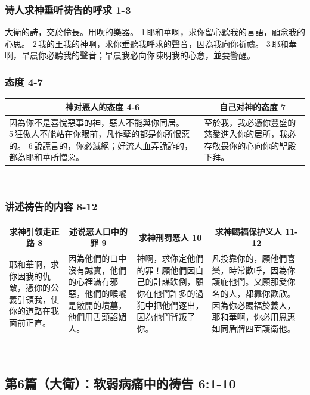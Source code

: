\subsubsection{诗人求神垂听祷告的呼求  1-3}
大衛的詩，交於伶長。用吹的樂器。
1 耶和華啊，求你留心聽我的言語，顧念我的心思。
2 我的王我的神啊，求你垂聽我呼求的聲音，因為我向你祈禱。
3 耶和華啊，早晨你必聽我的聲音；早晨我必向你陳明我的心意，並要警醒。

\subsubsection{态度 4-7}
\begin{table}[H]
\centering
\begin{tabular}{p{11.500cm}|p{5.2500cm}}\hline\hline
\multicolumn{1}{c|}{神对恶人的态度 4-6}&\multicolumn{1}{c}{自己对神的态度 7}\\\hline
因為你不是喜悅惡事的神，惡人不能與你同居。
5 狂傲人不能站在你眼前，凡作孽的都是你所恨惡的。
6 說謊言的，你必滅絕；好流人血弄詭詐的，都為耶和華所憎惡。
&至於我，我必憑你豐盛的慈愛進入你的居所，我必存敬畏你的心向你的聖殿下拜。\\\hline
\end{tabular}
\end{table} 

\subsubsection{讲述祷告的内容  8-12}
\begin{table}[H]
\centering
\begin{tabular}{p{2.9500cm}|p{4.00cm}|p{4.2500cm}|p{5.2500cm}}\hline\hline
\multicolumn{1}{c|}{求神引领走正路 8}&\multicolumn{1}{c|}{述说恶人口中的罪 9}&\multicolumn{1}{c|}{求神刑罚恶人 10}&\multicolumn{1}{c}{求神赐福保护义人 11-12}\\\hline
耶和華啊，求你因我的仇敵，憑你的公義引領我，使你的道路在我面前正直。
&因為他們的口中沒有誠實，他們的心裡滿有邪惡，他們的喉嚨是敞開的墳墓，他們用舌頭諂媚人。
&神啊，求你定他們的罪！願他們因自己的計謀跌倒，願你在他們許多的過犯中把他們逐出，因為他們背叛了你。
&凡投靠你的，願他們喜樂，時常歡呼，因為你護庇他們。又願那愛你名的人，都靠你歡欣。因為你必賜福於義人，耶和華啊，你必用恩惠如同盾牌四面護衛他。\\\hline
\end{tabular}
\end{table} 



\subsection{第6篇（大衛）：软弱病痛中的祷告  6:1-10}
